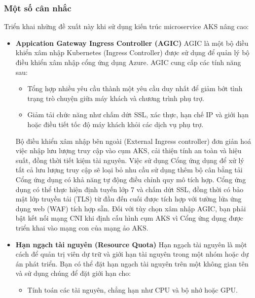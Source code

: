\subsubsection{Một số cân nhắc}
\noindent Triển khai những đề xuất này khi sử dụng kiến trúc microservice AKS nâng cao:
    \begin{itemize}
        \item \textbf{Appication Gateway Ingress Controller (AGIC)} 
            \newline
            AGIC là một bộ điều khiển xâm nhập Kubernetes (Ingress Controller) được sử dụng để quản lý bộ điều khiển xâm nhập cổng ứng dụng Azure. AGIC cung cấp các tính năng sau:
            \begin{itemize}
                \item Tổng hợp nhiều yêu cầu thành một yêu cầu duy nhất để giảm bớt tình trạng trò chuyện giữa máy khách và chương trình phụ trợ.
                \item Giảm tải chức năng như chấm dứt SSL, xác thực, hạn chế IP và giới hạn hoặc điều tiết tốc độ máy khách khỏi các dịch vụ phụ trợ.
            \end{itemize}
            Bộ điều khiển xâm nhập bên ngoài (External Ingress controller) đơn giản hoá việc nhập lưu lượng truy cập vào cụm AKS, cải thiện tính an toàn và hiệu suất, đồng thời tiết kiệm tài nguyên. Việc sử dụng Cổng ứng dụng để xử lý tất cả lưu lượng truy cập sẽ loại bỏ nhu cầu sử dụng thêm bộ cân bằng tải
            \newline
            Cổng ứng dụng có khả năng tự động điều chỉnh quy mô tích hợp. Cổng ứng dụng có thể thực hiện định tuyến lớp 7 và chấm dứt SSL, đồng thời có bảo mật lớp truyền tải (TLS) từ đầu đến cuối được tích hợp với tường lửa ứng dụng web (WAF) tích hợp sẵn.
            \newline
            Đối với tùy chọn xâm nhập AGIC, bạn phải bật kết nối mạng CNI khi định cấu hình cụm AKS vì Cổng ứng dụng được triển khai vào mạng con của mạng ảo AKS.
        \item \textbf{Hạn ngạch tài nguyên (Resource Quota)}
            \newline 
            Hạn ngạch tài nguyên là một cách để quản trị viên dự trữ và giới hạn tài nguyên trong một nhóm hoặc dự án phát triển. Bạn có thể đặt hạn ngạch tài nguyên trên một không gian tên và sử dụng chúng để đặt giới hạn cho:
            \begin{itemize}
                \item Tính toán các tài nguyên, chẳng hạn như CPU và bộ nhớ hoặc GPU.

\end{itemize}
\end{itemize}
